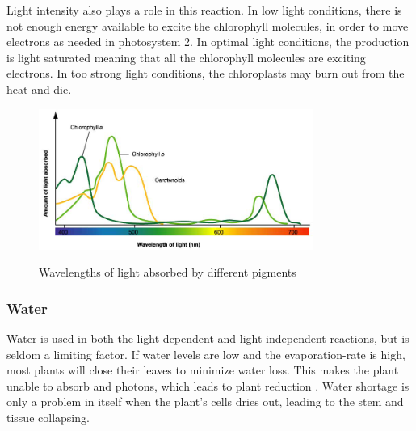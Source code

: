 Light intensity also plays a role in this reaction. In low light conditions, there is not enough energy available to excite the chlorophyll molecules, in order to move electrons as needed in photosystem 2. In optimal light conditions, the production is light saturated meaning that all the chlorophyll molecules are exciting electrons. In too strong light conditions, the chloroplasts may burn out from the heat and die.  

\begin{figure}
        \centering
        \includegraphics[width=0.8\textwidth]{img/photosynthesis/absorption-spectrum.png}
        \caption{Wavelengths of light absorbed by different pigments}
        \citep{uicbiology}
        \label{fig:wavelengthabsorbtion}
\end{figure}

\subsubsection{Water}
Water is used in both the light-dependent and light-independent reactions, but is seldom a limiting factor. If water levels are low and the evaporation-rate is high, most plants will close their leaves to minimize water loss. This makes the plant unable to absorb  and photons, which leads to plant reduction \citep{bi2}. Water shortage is only a problem in itself when the plant's cells dries out, leading to the stem and tissue collapsing. 



